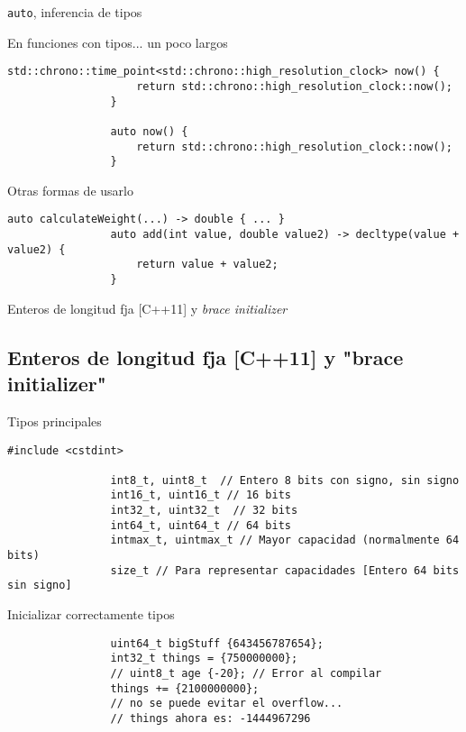 \documentclass{beamer}
\newcommand{\normalSizeItem}[1] {
  \normalsize{\item #1}
}
\begin{document}
		\begin{frame}[fragile]{\texttt{auto}, inferencia de tipos}	
			\begin{itemize}
			
				\normalSizeItem{En funciones con tipos... un poco largos}
				\begin{lstlisting}[basicstyle={\tiny\ttfamily}]
				std::chrono::time_point<std::chrono::high_resolution_clock> now() {
					return std::chrono::high_resolution_clock::now();
				}
				
				auto now() {
					return std::chrono::high_resolution_clock::now();
				}
				\end{lstlisting}
								
				\normalSizeItem { Otras formas de usarlo }
				\begin{lstlisting}[basicstyle={\tiny\ttfamily}]
				auto calculateWeight(...) -> double { ... }
				auto add(int value, double value2) -> decltype(value + value2) {
					return value + value2;
				}
				\end{lstlisting}
				
			\end{itemize}
		\end{frame}
		
		\begin{frame}[fragile]{Enteros de longitud fja [C++11] y \textit{brace initializer}}	
			\subsection{Enteros de longitud fja [C++11] y "brace initializer"}
			\begin{itemize}
			
				\normalSizeItem{Tipos principales}
				\begin{lstlisting}[basicstyle={\tiny\ttfamily}]
				#include <cstdint>

				int8_t, uint8_t  // Entero 8 bits con signo, sin signo
				int16_t, uint16_t // 16 bits
				int32_t, uint32_t  // 32 bits
				int64_t, uint64_t // 64 bits
				intmax_t, uintmax_t // Mayor capacidad (normalmente 64 bits)
				size_t // Para representar capacidades [Entero 64 bits sin signo]
				\end{lstlisting}
								
				\normalSizeItem { Inicializar correctamente tipos }
				\begin{lstlisting}
				uint64_t bigStuff {643456787654};
				int32_t things = {750000000};
				// uint8_t age {-20}; // Error al compilar
				things += {2100000000};
				// no se puede evitar el overflow...
				// things ahora es: -1444967296
				\end{lstlisting}
				
			\end{itemize}
		\end{frame}
		
\end{document}
